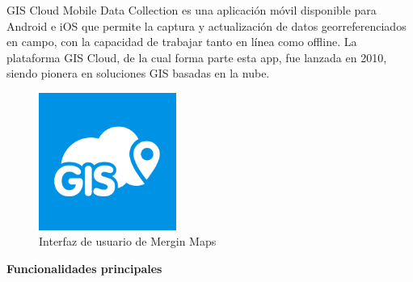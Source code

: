 \documentclass{article}
\begin{document}
GIS Cloud Mobile Data Collection \cite{giscloudhow} es una aplicación móvil disponible para Android e iOS que permite la captura y actualización de datos georreferenciados en campo, con la capacidad de trabajar tanto en línea como offline. La plataforma GIS Cloud, de la cual forma parte esta app, fue lanzada en 2010, siendo pionera en soluciones GIS basadas en la nube.

\begin{figure}[h]
  \centering
  \includegraphics[width=0.4\textwidth]{images/gis_cloud.png}
  \caption{Interfaz de usuario de Mergin Maps}
  \label{fig:giscloud}
\end{figure}

\textbf{Funcionalidades principales}
\end{document}
